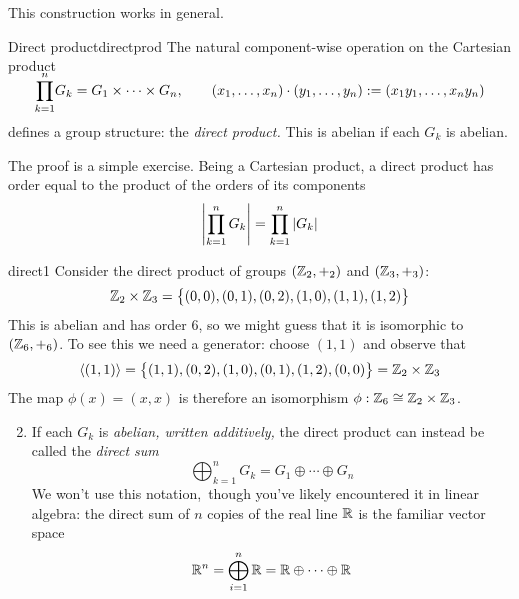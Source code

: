 This construction works in general.

\begin{thm}{Direct product}{directprod}
The natural component-wise operation on the Cartesian product
\[\smash[t]{\prod\limits_{k=1}^n} G_k=G_1\times\cdots\times G_n,\qquad (x_1,\ldots,x_n)\cdot(y_1,\ldots,y_n):=(x_1y_1,\ldots,x_ny_n)\]
defines a group structure: the \emph{direct product.} This is abelian if each $G_k$ is abelian.
\end{thm}

The proof is a simple exercise. Being a Cartesian product, a direct product has order equal to the product of the orders of its components
\[\left| \prod\limits_{k=1}^n G_k\right|=\prod\limits_{k=1}^n\left| G_k\right|\]
\vspace{2pt}


\begin{examples}{}{direct1}
\exstart Consider the direct product of groups $(\mathbb{Z}_2,+_2)$ and $(\mathbb{Z}_3,+_3)$:
\[\mathbb{Z}_2\times\mathbb{Z}_3=\bigl\{(0,0),(0,1),(0,2),(1,0),(1,1),(1,2)\bigr\}\]
This is abelian and has order 6, so we might guess that it is isomorphic to $(\mathbb{Z}_6,+_6)$. To see this we need a generator: choose $(1,1)$ and observe that
\[\left\langle (1,1)\right\rangle=\bigl\{(1,1),(0,2),(1,0),(0,1),(1,2),(0,0)\bigr\}=\mathbb{Z}_2\times\mathbb{Z}_3\]
The map $\phi(x)=(x,x)$ is therefore an isomorphism $\phi:\mathbb{Z}_6\cong\mathbb{Z}_2\times \mathbb{Z}_3$.

\goodbreak

\begin{enumerate}\setcounter{enumi}{1}
	\item If each $G_k$ is \emph{abelian, written additively,} the direct product can instead be called the \emph{direct sum}
	\[\bigoplus_{k=1}^nG_k=G_1\oplus\cdots\oplus G_n\]
	We won't use this notation,\footnotemark\ though you've likely encountered it in linear algebra: the direct sum of $n$ copies of the real line $\mathbb{R}$ is the familiar vector space
	\[\mathbb{R}^n=\bigoplus_{i=1}^n\mathbb{R}=\mathbb{R}\oplus\cdots\oplus\mathbb{R}\]
\end{enumerate}
\end{examples}



